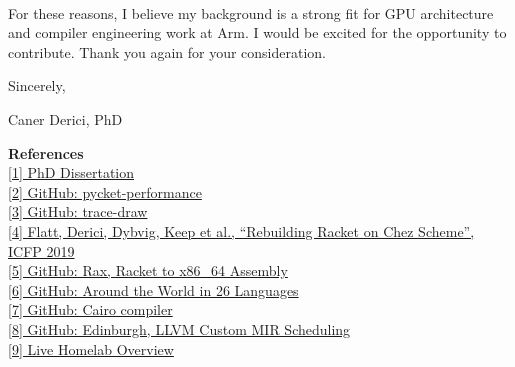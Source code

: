 \paragraph{} %
For these reasons, I believe my background is a strong fit for GPU architecture and compiler engineering work at Arm. I would be excited for the opportunity to contribute. Thank you again for your consideration.

\vspace{1.2em}

Sincerely,

Caner Derici, PhD

\vfill

{\small
	\noindent\textbf{References} \\[0.25em]
	\noindent \href{\dissertationurl}{[1] PhD Dissertation} \\
	\noindent \href{\pycketperfurl}{[2] GitHub: pycket-performance} \\
	\noindent \href{\tracedrawurl}{[3] GitHub: trace-draw} \\
	\noindent \href{\icfpreporturl}{[4] Flatt, Derici, Dybvig, Keep et al., ``Rebuilding Racket on Chez Scheme'', ICFP 2019} \\
	\noindent \href{\raxurl}{[5] GitHub: Rax, Racket to x86\_64 Assembly} \\
	\noindent \href{\atwurl}{[6] GitHub: Around the World in 26 Languages} \\
	\noindent \href{\cairolang}{[7] GitHub: Cairo compiler} \\
	\noindent \href{\edinburghurl}{[8] GitHub: Edinburgh, LLVM Custom MIR Scheduling} \\
	\noindent \href{\homelaburl}{[9] Live Homelab Overview}
}



